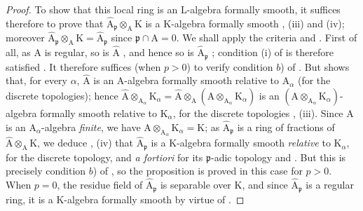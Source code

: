 \begin{proof}
To show that this local ring is an $\mathrm{L}$-algebra formally smooth, it suffices therefore to prove that $\widehat{\mathrm{A}}_\mathfrak{p}\otimes_\mathrm{A}\mathrm{K}$ is a $\mathrm{K}$-algebra formally smooth , (iii) and (iv); moreover $\widehat{\mathrm{A}}_\mathfrak{p}\otimes_\mathrm{A}\mathrm{K}=\widehat{\mathrm{A}}_\mathfrak{p}$ since $\mathfrak{p}\cap\mathrm{A}=0$.
We shall apply the criteria  and .
First of all, as $\mathrm{A}$ is regular, so is $\widehat{\mathrm{A}}$ , and hence so is $\widehat{\mathrm{A}}_\mathfrak{p}$ ; condition (i) of  is therefore satisfied .
It therefore suffices (when $p>0$) to verify condition $b$) of .
But  shows that, for every $\alpha$, $\widehat{\mathrm{A}}$ is an $\mathrm{A}$-algebra formally smooth relative to $\mathrm{A}_\alpha$ (for the discrete topologies); hence $\widehat{\mathrm{A}}\otimes_{\mathrm{A}_\alpha}\mathrm{K}_\alpha=\widehat{\mathrm{A}}\otimes_\mathrm{A}(\mathrm{A}\otimes_{\mathrm{A}_\alpha}\mathrm{K}_\alpha)$ is an $(\mathrm{A}\otimes_{\mathrm{A}_\alpha}\mathrm{K}_\alpha)$-algebra formally smooth relative to $\mathrm{K}_\alpha$, for the discrete topologies , (iii).
Since $\mathrm{A}$ is an $\mathrm{A}_\alpha$-algebra \emph{finite}, we have $\mathrm{A}\otimes_{\mathrm{A}_\alpha}\mathrm{K}_\alpha=\mathrm{K}$; as $\widehat{\mathrm{A}}_\mathfrak{p}$ is a ring of fractions of $\widehat{\mathrm{A}}\otimes_\mathrm{A}\mathrm{K}$, we deduce , (iv) that $\widehat{\mathrm{A}}_\mathfrak{p}$ is a $\mathrm{K}$-algebra formally smooth \emph{relative} to $\mathrm{K}_\alpha$, for the discrete topology, and \emph{a fortiori} for its $\mathfrak{p}$-adic topology  and .
But this is precisely condition $b$) of , so the proposition is proved in this case for $p>0$.
When $p=0$, the residue field of $\widehat{\mathrm{A}}_\mathfrak{p}$ is separable over $\mathrm{K}$, and since $\widehat{\mathrm{A}}_\mathfrak{p}$ is a regular ring, it is a $\mathrm{K}$-algebra formally smooth by virtue of .


\end{proof}
